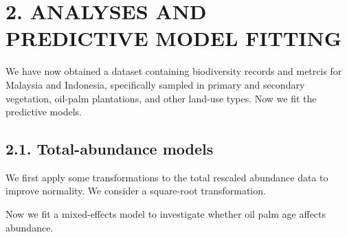 \documentclass[
  letterpaper,
  DIV=11,
  numbers=noendperiod]{scrartcl}
\newenvironment{Shaded}{\begin{snugshade}}{\end{snugshade}}
\newcommand{\AttributeTok}[1]{\textcolor[rgb]{0.40,0.45,0.13}{#1}}
\newcommand{\CommentTok}[1]{\textcolor[rgb]{0.37,0.37,0.37}{#1}}
\newcommand{\DecValTok}[1]{\textcolor[rgb]{0.68,0.00,0.00}{#1}}
\newcommand{\DocumentationTok}[1]{\textcolor[rgb]{0.37,0.37,0.37}{\textit{#1}}}
\newcommand{\FunctionTok}[1]{\textcolor[rgb]{0.28,0.35,0.67}{#1}}
\newcommand{\NormalTok}[1]{\textcolor[rgb]{0.00,0.23,0.31}{#1}}
\newcommand{\OtherTok}[1]{\textcolor[rgb]{0.00,0.23,0.31}{#1}}
\newcommand{\SpecialCharTok}[1]{\textcolor[rgb]{0.37,0.37,0.37}{#1}}
\begin{document}
\hypertarget{analyses-and-predictive-model-fitting}{%
\section{2. ANALYSES AND PREDICTIVE MODEL
FITTING}\label{analyses-and-predictive-model-fitting}}

We have now obtained a dataset containing biodiversity records and
metrcis for Malaysia and Indonesia, specifically sampled in primary and
secondary vegetation, oil-palm plantations, and other land-use types.
Now we fit the predictive models.

\hypertarget{total-abundance-models}{%
\subsection{2.1. Total-abundance models}\label{total-abundance-models}}

We first apply some transformations to the total rescaled abundance data
to improve normality. We consider a square-root transformation.

\begin{Shaded}
\end{Shaded}

Now we fit a mixed-effects model to investigate whether oil palm age
affects abundance.

\begin{Shaded}
\end{Shaded}
\end{document}
